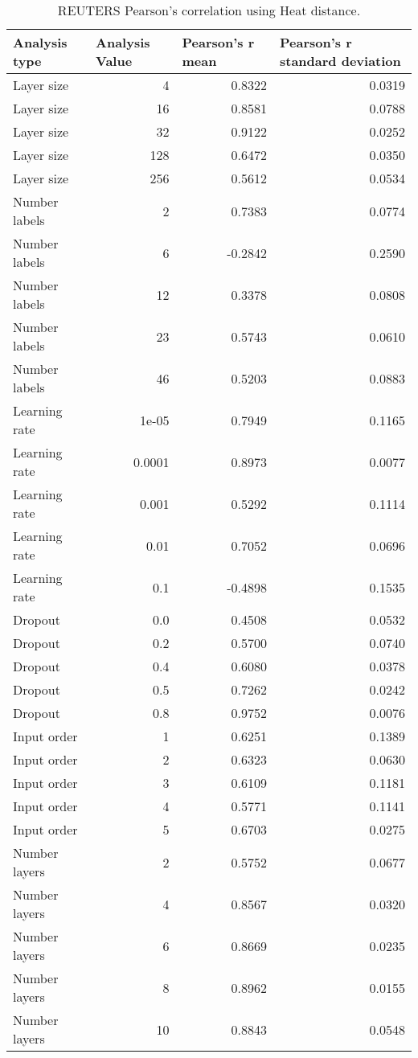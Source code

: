 \documentclass{article}
\begin{document}
\begin{table}[H]
\centering
\begin{tabular}{@{}lrrr@{}}
\toprule
Analysis type & \multicolumn{1}{l}{Analysis Value} & \multicolumn{1}{l}{Pearson's r mean} & \multicolumn{1}{l}{Pearson's r standard deviation} \\ \midrule
Layer size & 4 & 0.8322 & 0.0319 \\ 
Layer size & 16 & 0.8581 & 0.0788 \\ 
Layer size & 32 & 0.9122 & 0.0252 \\ 
Layer size & 128 & 0.6472 & 0.0350 \\ 
Layer size & 256 & 0.5612 & 0.0534 \\ 
Number labels & 2 & 0.7383 & 0.0774 \\ 
Number labels & 6 & -0.2842 & 0.2590 \\ 
Number labels & 12 & 0.3378 & 0.0808 \\ 
Number labels & 23 & 0.5743 & 0.0610 \\ 
Number labels & 46 & 0.5203 & 0.0883 \\ 
Learning rate & 1e-05 & 0.7949 & 0.1165 \\ 
Learning rate & 0.0001 & 0.8973 & 0.0077 \\ 
Learning rate & 0.001 & 0.5292 & 0.1114 \\ 
Learning rate & 0.01 & 0.7052 & 0.0696 \\ 
Learning rate & 0.1 & -0.4898 & 0.1535 \\ 
Dropout & 0.0 & 0.4508 & 0.0532 \\ 
Dropout & 0.2 & 0.5700 & 0.0740 \\ 
Dropout & 0.4 & 0.6080 & 0.0378 \\ 
Dropout & 0.5 & 0.7262 & 0.0242 \\ 
Dropout & 0.8 & 0.9752 & 0.0076 \\ 
Input order & 1 & 0.6251 & 0.1389 \\ 
Input order & 2 & 0.6323 & 0.0630 \\ 
Input order & 3 & 0.6109 & 0.1181 \\ 
Input order & 4 & 0.5771 & 0.1141 \\ 
Input order & 5 & 0.6703 & 0.0275 \\ 
Number layers & 2 & 0.5752 & 0.0677 \\ 
Number layers & 4 & 0.8567 & 0.0320 \\ 
Number layers & 6 & 0.8669 & 0.0235 \\ 
Number layers & 8 & 0.8962 & 0.0155 \\ 
Number layers & 10 & 0.8843 & 0.0548 \\ 
\bottomrule
\end{tabular}
\caption{REUTERS Pearson's correlation using Heat distance.}
\end{table}
\end{document}
